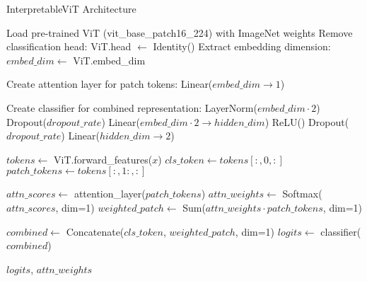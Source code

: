 \documentclass[a4paper,12pt]{article}
\begin{document}
            \begin{algorithm}
                \caption{InterpretableViT Architecture}
                \begin{algorithmic}[1]
                    \State Load pre-trained ViT (vit\_base\_patch16\_224) with ImageNet weights
                    \State Remove classification head: ViT.head $\gets$ Identity()
                    \State Extract embedding dimension: $embed\_dim \gets$ ViT.embed\_dim
                    
                    \State Create attention layer for patch tokens:
                    \Indent
                        \State Linear($embed\_dim \to 1$)
                    \EndIndent
                    
                    \State Create classifier for combined representation:
                    \Indent
                        \State LayerNorm($embed\_dim \cdot 2$)
                        \State Dropout($dropout\_rate$)
                        \State Linear($embed\_dim \cdot 2 \to hidden\_dim$)
                        \State ReLU()
                        \State Dropout($dropout\_rate$)
                        \State Linear($hidden\_dim \to 2$)
                    \EndIndent
                \EndFunction
                
                    \State $tokens \gets$ ViT.forward\_features($x$) 
                    \State $cls\_token \gets tokens[:, 0, :]$ 
                    \State $patch\_tokens \gets tokens[:, 1:, :]$ 
                    
                    \State $attn\_scores \gets$ attention\_layer($patch\_tokens$)
                    \State $attn\_weights \gets$ Softmax($attn\_scores$, dim=1)
                    \State $weighted\_patch \gets$ Sum($attn\_weights \cdot patch\_tokens$, dim=1)
                    
                    \State $combined \gets$ Concatenate($cls\_token$, $weighted\_patch$, dim=1)
                    \State $logits \gets$ classifier($combined$)
                    
                    \State \Return $logits$, $attn\_weights$ 
                \EndFunction
                \end{algorithmic}
                \end{algorithm}
\end{document}
